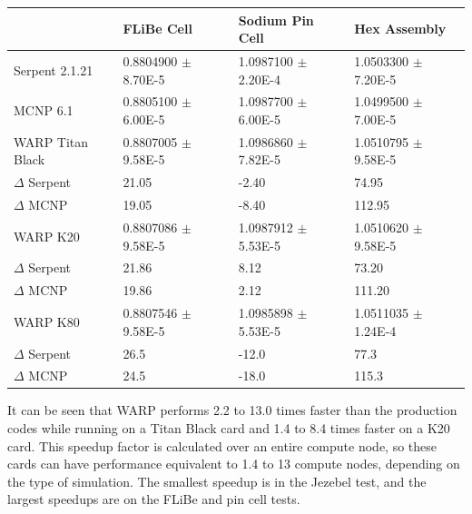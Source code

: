 \documentclass[preprint,12pt]{elsarticle}
\begin{document}
\begin{table}[h]
\begin{tabular}{| l | l | l | l |}
\cline{2-4}
\multicolumn{1}{c|}{}               & FLiBe Cell              & Sodium Pin Cell         & Hex Assembly              \\
\hline
Serpent 2.1.21                      & 0.8804900 $\pm$ 8.70E-5 & 1.0987100 $\pm$ 2.20E-4 & 1.0503300 $\pm$ 7.20E-5   \\
\hline
MCNP 6.1                            & 0.8805100 $\pm$ 6.00E-5 & 1.0987700 $\pm$ 6.00E-5 & 1.0499500 $\pm$ 7.00E-5   \\
\hline
WARP Titan Black                    & 0.8807005 $\pm$ 9.58E-5 & 1.0986860 $\pm$ 7.82E-5 & 1.0510795 $\pm$ 9.58E-5   \\
    \qquad\qquad   $\Delta$ Serpent & 21.05                   & -2.40                   &  74.95                    \\
    \qquad\qquad   $\Delta$ MCNP    & 19.05                   & -8.40                   & 112.95                    \\
\hline
WARP K20                            & 0.8807086 $\pm$ 9.58E-5 & 1.0987912 $\pm$ 5.53E-5 & 1.0510620 $\pm$ 9.58E-5   \\
    \qquad\qquad   $\Delta$ Serpent & 21.86                   & 8.12                    &  73.20                    \\
    \qquad\qquad   $\Delta$ MCNP    & 19.86                   & 2.12                    & 111.20                    \\
\hline
WARP K80                            & 0.8807546 $\pm$ 9.58E-5 & 1.0985898 $\pm$ 5.53E-5 & 1.0511035 $\pm$ 1.24E-4   \\
    \qquad\qquad   $\Delta$ Serpent & 26.5                    & -12.0                   &  77.3                     \\
    \qquad\qquad   $\Delta$ MCNP    & 24.5                    & -18.0                   & 115.3                     \\
\hline
\end{tabular}
\end{table}




It can be seen that WARP performs 2.2 to 13.0 times faster than the production codes while running on a Titan Black card and 1.4 to 8.4 times faster on a K20 card.  This speedup factor is calculated over an entire compute node, so these cards can have performance equivalent to 1.4 to 13 compute nodes, depending on the type of simulation.   The smallest speedup is in the Jezebel test, and the largest speedups are on the FLiBe and pin cell tests.
\end{document}
